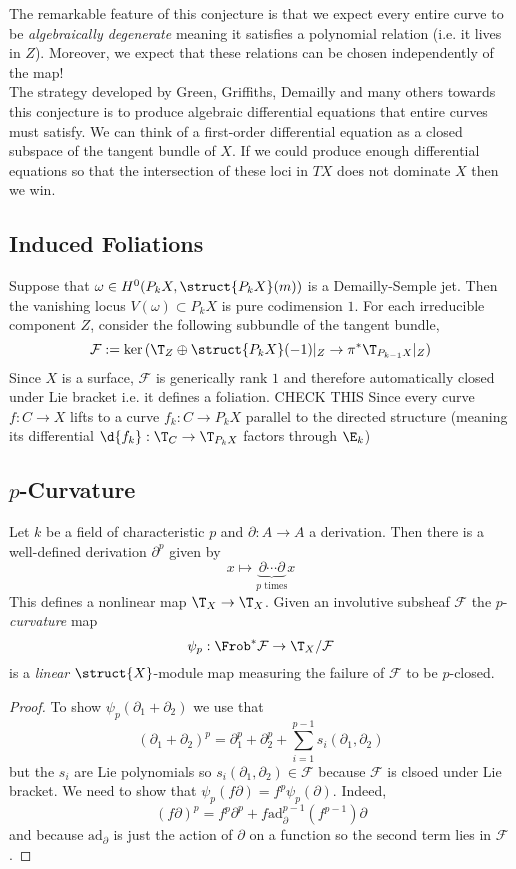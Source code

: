 \documentclass[12pt]{article}
\renewcommand{\F}{\mathcal{F}}
\newcommand{\ad}{\mathrm{ad}}
\begin{document}
The remarkable feature of this conjecture is that we expect every entire curve to be \textit{algebraically degenerate} meaning it satisfies a polynomial relation (i.e. it lives in $Z$). Moreover, we expect that these relations can be chosen independently of the map! 
\bigskip\\
The strategy developed by Green, Griffiths, Demailly and many others towards this conjecture is to produce algebraic differential equations that entire curves must satisfy. We can think of a first-order differential equation as a closed subspace of the tangent bundle of $X$. If we could produce enough differential equations so that the intersection of these loci in $T X$ does not dominate $X$ then we win. 

\subsection{Induced Foliations}

Suppose that $\omega \in H^0(P_k X, \struct{P_k X}(m))$ is a Demailly-Semple jet. Then the vanishing locus $V(\omega) \subset P_k X$ is pure codimension $1$. For each irreducible component $Z$, consider the following subbundle of the tangent bundle,
\[ \F := \ker{(\T_Z \oplus \struct{P_k X}(-1)|_Z \to \pi^* \T_{P_{k-1}X} |_Z)} \]
Since $X$ is a surface, $\F$ is generically rank $1$ and therefore automatically closed under Lie bracket i.e. it defines a foliation. {\color{red} CHECK THIS} Since every curve $f : C \to X$ lifts to a curve $f_k : C \to P_k X$ parallel to the directed structure (meaning its differential $\d{f_k} : \T_C \to \T_{P_k X}$ factors through $\E_k$)

\subsection{$p$-Curvature}

\begin{defn}
Let $k$ be a field of characteristic $p$ and $\partial : A \to A$ a derivation. Then there is a well-defined derivation $\partial^p$ given by 
\[ x \mapsto \underbrace{\partial \cdots \partial}_{p \text{ times}} x \]
This defines a nonlinear map $\T_X \to \T_X$. Given an involutive subsheaf $\F$ the $p$-\textit{curvature} map 
\[ \psi_p : \Frob^* \F \to \T_X / \F \]
is a \textit{linear} $\struct{X}$-module map measuring the failure of $\F$ to be $p$-closed.
\end{defn}

\begin{proof}
To show $\psi_p(\partial_1 + \partial_2)$ we use that
\[ (\partial_1 + \partial_2)^p = \partial_1^p + \partial_2^p + \sum_{i = 1}^{p-1} s_i(\partial_1, \partial_2) \]
but the $s_i$ are Lie polynomials so $s_i(\partial_1, \partial_2) \in \F$ because $\F$ is clsoed under Lie bracket.
We need to show that $\psi_p(f \partial) = f^p \psi_p(\partial)$. Indeed, 
\[ (f \partial)^p = f^p \partial^p + f \ad_{\partial}^{p-1}(f^{p-1}) \partial \]
and because $\ad_{\partial}$ is just the action of $\partial$ on a function so the second term lies in $\F$.
\end{proof}
\end{document}
